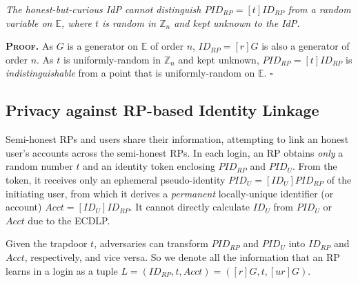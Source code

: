 
\vspace{1.5mm}
\begin{thm}
\emph{The honest-but-curious IdP cannot distinguish $PID_{RP} = [t]ID_{RP}$ from a random variable on $\mathbb{E}$, where $t$ is random in $\mathbb{Z}_n$ and kept unknown to the IdP.}\label{thm-idp-untraceability}
\end{thm}

\noindent\textbf{\textsc{Proof.}}
As $G$ is a generator on $\mathbb{E}$ of order $n$, $ID_{RP} = [r]G$ is also a generator of order $n$.
As $t$ is uniformly-random in $\mathbb{Z}_n$ and kept unknown, $PID_{RP} = [t]ID_{RP}$ is \emph{indistinguishable} from a point that is uniformly-random on $\mathbb{E}$.
\hfill $\square$

\vspace{1.5mm}


\subsection{Privacy against RP-based Identity Linkage}
\label{subsec:RP-privacy}

Semi-honest RPs and users share their information, attempting to 
link an honest user's accounts across the semi-honest RPs.
%
In each login, an RP obtains \emph{only} a random number $t$ and an identity token enclosing $PID_{RP}$ and $PID_U$. From the token, it receives only an ephemeral pseudo-identity $PID_{U} = [{ID_U}]{PID_{RP}}$ of the initiating user, from which it derives a \emph{permanent} locally-unique identifier (or account) $Acct = [ID_U]ID_{RP}$.
It cannot directly calculate $ID_U$ from $PID_{U}$ or $Acct$ due to the ECDLP.


Given the trapdoor $t$, 
    adversaries can transform $PID_{RP}$ and $PID_U$ into $ID_{RP}$ and $Acct$, respectively, and vice versa.
So we denote all the information that an RP learns in a login as a tuple $L =(ID_{RP}, t, Acct)=([r]G, t, [ur]G)$.

